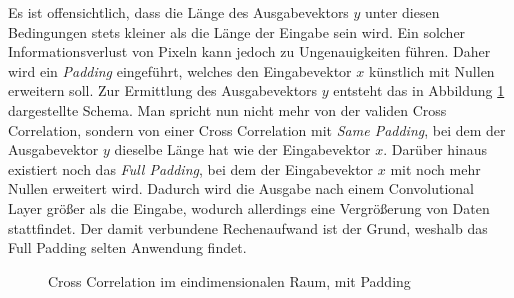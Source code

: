 \documentclass[12pt,a4]{article}
\begin{document}
Es ist offensichtlich, dass die Länge des Ausgabevektors $y$ unter diesen Bedingungen stets kleiner als die Länge der Eingabe sein wird. Ein solcher Informationsverlust von Pixeln kann jedoch zu Ungenauigkeiten führen. Daher wird ein \textit{Padding} eingeführt, welches den Eingabevektor $x$ künstlich mit Nullen erweitern soll. Zur Ermittlung des Ausgabevektors $y$ entsteht das in Abbildung \ref{fig:CrossCorrelationWithPadding} dargestellte Schema. Man spricht nun nicht mehr von der validen Cross Correlation, sondern von einer Cross Correlation mit \textit{Same Padding}, bei dem der Ausgabevektor $y$ dieselbe Länge hat wie der Eingabevektor $x$. Darüber hinaus existiert noch das \textit{Full Padding}, bei dem der Eingabevektor $x$ mit noch mehr Nullen erweitert wird. Dadurch wird die Ausgabe nach einem Convolutional Layer größer als die Eingabe, wodurch allerdings eine Vergrößerung von Daten stattfindet. Der damit verbundene Rechenaufwand ist der Grund, weshalb das Full Padding selten Anwendung findet.

\begin{figure}[!h]
\centering
{}
\caption{Cross Correlation im eindimensionalen Raum, mit Padding}
\label{fig:CrossCorrelationWithPadding}
\end{figure}
\end{document}
